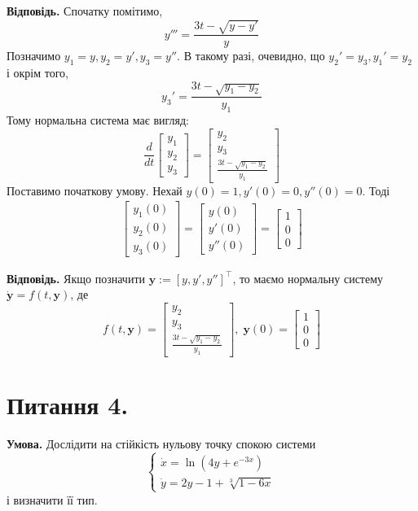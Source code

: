 \documentclass[14pt]{extarticle}
\begin{document}
\textbf{Відповідь.} Спочатку помітимо,
\[
y''' = \frac{3t-\sqrt{y-y'}}{y}
\]
Позначимо $y_1=y,y_2=y',y_3=y''$. В такому разі, очевидно, що $y_2'=y_3,y_1'=y_2$ і окрім того,
\[
y_3' = \frac{3t-\sqrt{y_1-y_2}}{y_1}
\]
Тому нормальна система має вигляд:
\[
\frac{d}{dt}\begin{bmatrix}
    y_1 \\ y_2 \\ y_3
\end{bmatrix} = \begin{bmatrix}
    y_2 \\ y_3 \\ \frac{3t-\sqrt{y_1-y_2}}{y_1}
\end{bmatrix}
\]
Поставимо початкову умову. Нехай $y(0)=1,y'(0)=0,y''(0)=0$. Тоді
\begin{gather*}
\begin{bmatrix}
    y_1(0) \\ y_2(0) \\ y_3(0)
\end{bmatrix} = \begin{bmatrix}
    y(0) \\ y'(0) \\ y''(0)
\end{bmatrix} = \begin{bmatrix}
    1 \\ 0 \\ 0
\end{bmatrix}
\end{gather*}

\textbf{Відповідь.} Якщо позначити $\mathbf{y}:=[y,y',y'']^{\top}$, то маємо нормальну систему $\dot{\mathbf{y}}=f(t,\mathbf{y})$, де
\[
f(t,\mathbf{y}) = \begin{bmatrix}
    y_2 \\ y_3 \\ \frac{3t-\sqrt{y_1-y_2}}{y_1}
\end{bmatrix}, \; \mathbf{y}(0) = \begin{bmatrix}
    1 \\ 0 \\ 0
\end{bmatrix}
\]

\pagebreak

\section*{Питання 4.}

\textbf{Умова.} Дослідити на стійкість нульову точку спокою системи
\begin{equation}
\begin{cases}
    \dot{x} = \ln(4y+e^{-3x}) \\
    \dot{y} = 2y-1+\sqrt[3]{1-6x}
\end{cases}
\end{equation}
і визначити її тип. 
\end{document}
